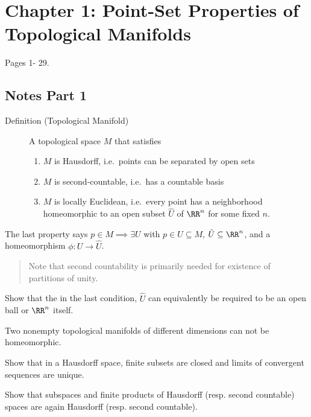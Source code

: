 \hypertarget{chapter-1-point-set-properties-of-topological-manifolds}{%
\section{Chapter 1: Point-Set Properties of Topological
Manifolds}\label{chapter-1-point-set-properties-of-topological-manifolds}}

Pages 1- 29.

\hypertarget{notes-part-1}{%
\subsection{Notes Part 1}\label{notes-part-1}}

\begin{description}
\item[Definition (Topological Manifold)]
A topological space \(M\) that satisfies

\begin{enumerate}
\def\labelenumi{\arabic{enumi}.}
\tightlist
\item
  \(M\) is Hausdorff, i.e.~points can be separated by open sets
\item
  \(M\) is second-countable, i.e.~has a countable basis
\item
  \(M\) is locally Euclidean, i.e.~every point has a neighborhood
  homeomorphic to an open subset \(\hat U\) of \(\RR^n\) for some fixed
  \(n\).
\end{enumerate}
\end{description}

The last property says \(p\in M \implies \exists U\) with
\(p\in U \subseteq M\), \(\hat U\subseteq \RR^n\), and a homeomorphism
\(\phi: U \to \hat U\).

\begin{quote}
Note that second countability is primarily needed for existence of
partitions of unity.
\end{quote}

\begin{description}
\tightlist
\item[Exercise]
Show that the in the last condition, \(\hat U\) can equivalently be
required to be an open ball or \(\RR^n\) itself.
\item[Theorem (Topological Invariance of Dimension)]
Two nonempty topological manifolds of different dimensions can not be
homeomorphic.
\item[Exercise]
Show that in a Hausdorff space, finite subsets are closed and limits of
convergent sequences are unique.
\item[Exercise]
Show that subspaces and finite products of Hausdorff (resp. second
countable) spaces are again Hausdorff (resp. second
countable).\label{ex:subspaces_and_products_of_hausdorff}
\end{description}

